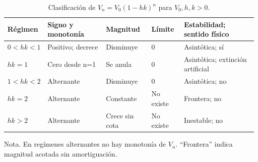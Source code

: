 \begin{table}[htbp]\centering\small
\caption{Clasificación de $V_n=V_0(1-hk)^n$ para $V_0,h,k>0$.}\label{tab:clasificacion}
\begin{tabular}{p{1.7cm}p{2.5cm}p{2.2cm}p{1.5cm}p{4.3cm}}
\toprule Régimen & Signo y monotonía & Magnitud & Límite & Estabilidad; sentido físico\\\midrule
$0<hk<1$ & Positivo; decrece & Disminuye & 0 & Asintótica; sí\\
$hk=1$ & Cero desde n=1 & Se anula & 0 & Asintótica; extinción artificial\\
$1<hk<2$ & Alternante & Disminuye & 0 & Asintótica; no\\
$hk=2$ & Alternante & Constante & No existe & Frontera; no\\
$hk>2$ & Alternante & Crece sin cota & No existe & Inestable; no\\
\bottomrule\end{tabular}
\par\smallskip\footnotesize Nota. En regímenes alternantes no hay monotonía de $V_n$. ``Frontera'' indica magnitud acotada sin amortiguación.
\end{table}